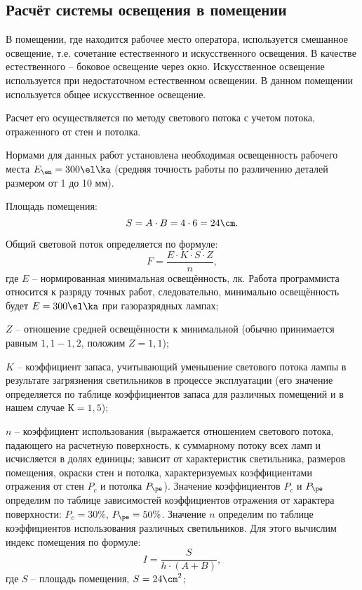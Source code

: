 \subsection{Расчёт системы освещения в помещении}

В помещении, где находится рабочее место оператора, используется смешанное освещение, т.е. сочетание естественного и искусственного освещения. В качестве естественного -- боковое освещение через окно. Искусственное освещение используется при недостаточном естественном освещении. В данном помещении используется общее искусственное освещение.

Расчет его осуществляется по методу светового потока с учетом потока, отраженного от стен и потолка.

Нормами для данных работ установлена необходимая освещенность рабочего места $E_{\en}=300\el\ka$ (средняя точность работы по различению деталей размером от 1 до 10 мм). 

Площадь помещения:
\begin{equation*}
	S = A \cdot B = 4 \cdot 6 = 24 \cm.
\end{equation*}

Общий световой поток определяется по формуле:
\begin{equation*}
	F = \frac{E \cdot K \cdot S \cdot Z}{n},
\end{equation*}
где $E$ -- нормированная минимальная освещённость, лк. Работа программиста относится к разряду точных работ, следовательно, минимально освещённость будет $E = 300 \el\ka$ при газоразрядных лампах;

$Z$ -- отношение средней освещённости к минимальной (обычно принимается равным $1,1-1,2$, положим $Z = 1,1$);

$K$ -- коэффициент запаса, учитывающий уменьшение светового потока лампы в результате загрязнения светильников в процессе эксплуатации (его значение определяется по таблице коэффициентов запаса для различных помещений и в нашем случае $К = 1,5$);

$n$ -- коэффициент использования (выражается отношением светового потока, падающего на расчетную поверхность, к суммарному потоку всех ламп и исчисляется в долях единицы; зависит от характеристик светильника, размеров помещения, окраски стен и потолка, характеризуемых коэффициентами отражения от стен $P_c$ и потолка $P_{\pe}$). Значение коэффициентов $P_c$ и $P_{\pe}$ определим по таблице зависимостей коэффициентов отражения от характера поверхности: $P_c=30\%$, $P_{\pe}=50\%$. Значение $n$ определим по таблице коэффициентов использования различных светильников. Для этого вычислим индекс помещения по формуле:
\begin{equation*}
	I = \frac{S}{h \cdot (A + B)},
\end{equation*}
где $S$ -- площадь помещения, $S = 24 \cm^2$;

